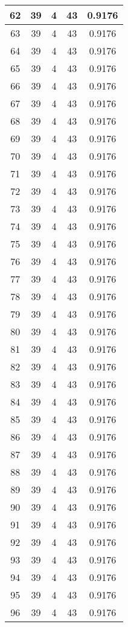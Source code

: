 \documentclass[letterpaper, 12pt]{article}
\begin{document}
\begin{longtable}{|c|c|c|c|c|}
\hline
62 & 39 & 4 & 43 & 0.9176 \\
\hline
63 & 39 & 4 & 43 & 0.9176 \\
\hline
64 & 39 & 4 & 43 & 0.9176 \\
\hline
65 & 39 & 4 & 43 & 0.9176 \\
\hline
66 & 39 & 4 & 43 & 0.9176 \\
\hline
67 & 39 & 4 & 43 & 0.9176 \\
\hline
68 & 39 & 4 & 43 & 0.9176 \\
\hline
69 & 39 & 4 & 43 & 0.9176 \\
\hline
70 & 39 & 4 & 43 & 0.9176 \\
\hline
71 & 39 & 4 & 43 & 0.9176 \\
\hline
72 & 39 & 4 & 43 & 0.9176 \\
\hline
73 & 39 & 4 & 43 & 0.9176 \\
\hline
74 & 39 & 4 & 43 & 0.9176 \\
\hline
75 & 39 & 4 & 43 & 0.9176 \\
\hline
76 & 39 & 4 & 43 & 0.9176 \\
\hline
77 & 39 & 4 & 43 & 0.9176 \\
\hline
78 & 39 & 4 & 43 & 0.9176 \\
\hline
79 & 39 & 4 & 43 & 0.9176 \\
\hline
80 & 39 & 4 & 43 & 0.9176 \\
\hline
81 & 39 & 4 & 43 & 0.9176 \\
\hline
82 & 39 & 4 & 43 & 0.9176 \\
\hline
83 & 39 & 4 & 43 & 0.9176 \\
\hline
84 & 39 & 4 & 43 & 0.9176 \\
\hline
85 & 39 & 4 & 43 & 0.9176 \\
\hline
86 & 39 & 4 & 43 & 0.9176 \\
\hline
87 & 39 & 4 & 43 & 0.9176 \\
\hline
88 & 39 & 4 & 43 & 0.9176 \\
\hline
89 & 39 & 4 & 43 & 0.9176 \\
\hline
90 & 39 & 4 & 43 & 0.9176 \\
\hline
91 & 39 & 4 & 43 & 0.9176 \\
\hline
92 & 39 & 4 & 43 & 0.9176 \\
\hline
93 & 39 & 4 & 43 & 0.9176 \\
\hline
94 & 39 & 4 & 43 & 0.9176 \\
\hline
95 & 39 & 4 & 43 & 0.9176 \\
\hline
96 & 39 & 4 & 43 & 0.9176 \\

\end{longtable}
\end{document}
